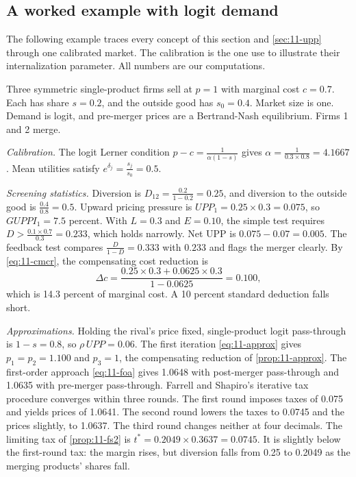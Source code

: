 \subsection{A worked example with logit demand}\label{sec:11-logitex}

The following example traces every concept of this section and \cref{sec:11-upp} through one calibrated market. The
calibration is the one \citet[p.~1780]{MillerWeinberg2017} use to illustrate their internalization parameter. All
numbers are our computations.

\begin{example}\label{ex:11-logit}
Three symmetric single-product firms sell at $p = 1$ with marginal cost $c = 0.7$. Each has share $s = 0.2$, and the
outside good has $s_0 = 0.4$. Market size is one. Demand is logit, and pre-merger prices are a Bertrand-Nash
equilibrium. Firms 1 and 2 merge.

\emph{Calibration.} The logit Lerner condition $p - c = \frac{1}{\alpha(1 - s)}$ gives
$\alpha = \frac{1}{0.3 \times 0.8} = 4.1667$. Mean utilities satisfy $e^{\delta_j} = \frac{s_j}{s_0} = 0.5$.

\emph{Screening statistics.} Diversion is $D_{12} = \frac{0.2}{1 - 0.2} = 0.25$, and diversion to the outside good is
$\frac{0.4}{0.8} = 0.5$. Upward pricing pressure is $\mathit{UPP}_1 = 0.25 \times 0.3 = 0.075$, so
$\mathit{GUPPI}_1 = 7.5$ percent. With $L = 0.3$ and $E = 0.10$, the simple test requires
$D > \frac{0.1 \times 0.7}{0.3} = 0.233$, which holds narrowly. Net UPP is $0.075 - 0.07 = 0.005$. The feedback test
compares $\frac{D}{1 - D} = 0.333$ with $0.233$ and flags the merger clearly. By \eqref{eq:11-cmcr}, the compensating
cost reduction is
\begin{equation*}
  \Delta c = \frac{0.25 \times 0.3 + 0.0625 \times 0.3}{1 - 0.0625} = 0.100 ,
\end{equation*}
which is 14.3 percent of marginal cost. A 10 percent standard deduction falls short.

\emph{Approximations.} Holding the rival's price fixed, single-product logit pass-through is $1 - s = 0.8$, so
$\rho\,\mathit{UPP} = 0.06$. The first iteration \eqref{eq:11-approx} gives $p_1 = p_2 = 1.100$ and $p_3 = 1$, the
compensating reduction of \cref{prop:11-approx}. The first-order approach \eqref{eq:11-foa} gives 1.0648 with
post-merger pass-through and 1.0635 with pre-merger pass-through. Farrell and Shapiro's iterative tax procedure
converges within three rounds. The first round imposes taxes of 0.075 and yields prices of 1.0641. The second round
lowers the taxes to 0.0745 and the prices slightly, to 1.0637. The third round changes neither at four decimals. The
limiting tax of
\cref{prop:11-fs2} is $t^* = 0.2049 \times 0.3637 = 0.0745$. It is slightly below the first-round tax: the margin rises,
but diversion falls from 0.25 to 0.2049 as the merging products' shares fall.


\end{example}

